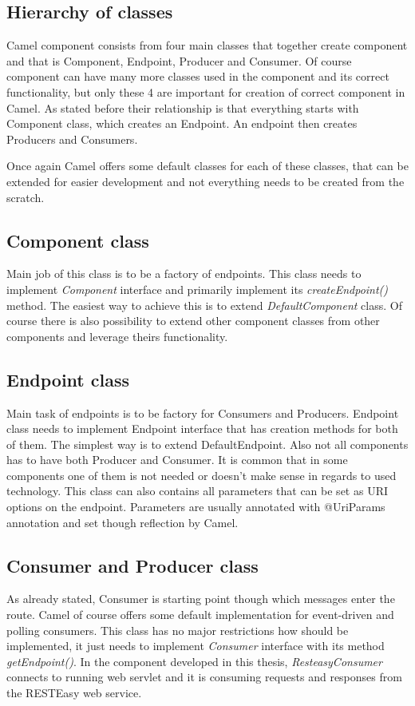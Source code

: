 \documentclass[12pt,final,oneside]{fithesis2}
\begin{document}
\subsection{Hierarchy of classes}
Camel component consists from four main classes that together create component and that is  Component, Endpoint, Producer and Consumer. Of course component can have many more classes  used in the component and its correct functionality, but only these 4 are important for creation of correct component in Camel. As stated before their relationship is that everything starts with Component class, which creates an Endpoint. An endpoint then creates Producers and Consumers.

Once again Camel offers some default classes for each of these classes, that can be extended for easier development and not everything needs to be created from the scratch.

\subsection*{Component class}
Main job of this class is to be a factory of endpoints. This class needs to implement \textit{Component} interface and primarily implement its \textit{createEndpoint()} method. The easiest way to achieve this is to extend \textit{DefaultComponent} class. Of course there is also possibility to extend other component classes from other components and leverage theirs functionality.

\subsection*{Endpoint class}
Main task of endpoints is to be factory for Consumers and Producers. Endpoint class needs to implement Endpoint interface that has creation methods for both of them. The simplest way is to extend DefaultEndpoint. Also not all components has to have both Producer and Consumer. It is common that in some components one of them is not needed or doesn't make sense in regards to used technology. This class can also contains all parameters that can be set as URI options on the endpoint. Parameters are usually annotated with @UriParams annotation and set though reflection by Camel.

\subsection*{Consumer and Producer class}
As already stated, Consumer is starting point though which messages enter the route. Camel of course offers some default implementation for event-driven and polling consumers. This class has no major restrictions how should be implemented, it just needs to implement \textit{Consumer} interface with its method \textit{getEndpoint()}. In the component developed in this thesis, \textit{ResteasyConsumer} connects to running web servlet and it is consuming requests and responses from the RESTEasy web service. 
\end{document}
